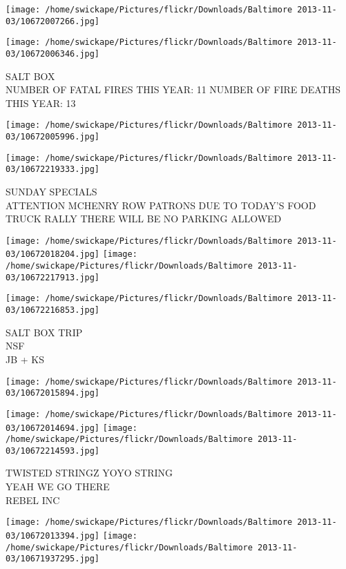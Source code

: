 \documentclass[10pt,letterpaper]{article}
\begin{document}
\texttt{[image: /home/swickape/Pictures/flickr/Downloads/Baltimore 2013-11-03/10672007266.jpg]}

\vspace{0.25in}
\texttt{[image: /home/swickape/Pictures/flickr/Downloads/Baltimore 2013-11-03/10672006346.jpg]}

SALT BOX\\
NUMBER OF FATAL FIRES THIS YEAR: 11 NUMBER OF FIRE DEATHS THIS YEAR: 13\\
\pagebreak

\texttt{[image: /home/swickape/Pictures/flickr/Downloads/Baltimore 2013-11-03/10672005996.jpg]}

\vspace{0.25in}
\texttt{[image: /home/swickape/Pictures/flickr/Downloads/Baltimore 2013-11-03/10672219333.jpg]}

SUNDAY SPECIALS\\
ATTENTION MCHENRY ROW PATRONS DUE TO TODAY'S FOOD TRUCK RALLY THERE WILL BE NO PARKING ALLOWED\\
\pagebreak

\texttt{[image: /home/swickape/Pictures/flickr/Downloads/Baltimore 2013-11-03/10672018204.jpg]}
\texttt{[image: /home/swickape/Pictures/flickr/Downloads/Baltimore 2013-11-03/10672217913.jpg]}

\vspace{0.25in}
\texttt{[image: /home/swickape/Pictures/flickr/Downloads/Baltimore 2013-11-03/10672216853.jpg]}

SALT BOX TRIP\\
NSF\\
JB + KS\\
\pagebreak

\texttt{[image: /home/swickape/Pictures/flickr/Downloads/Baltimore 2013-11-03/10672015894.jpg]}

\vspace{0.25in}
\texttt{[image: /home/swickape/Pictures/flickr/Downloads/Baltimore 2013-11-03/10672014694.jpg]}
\texttt{[image: /home/swickape/Pictures/flickr/Downloads/Baltimore 2013-11-03/10672214593.jpg]}

TWISTED STRINGZ YOYO STRING\\
YEAH WE GO THERE\\
REBEL INC\\
\pagebreak

\texttt{[image: /home/swickape/Pictures/flickr/Downloads/Baltimore 2013-11-03/10672013394.jpg]}
\texttt{[image: /home/swickape/Pictures/flickr/Downloads/Baltimore 2013-11-03/10671937295.jpg]}
\end{document}
